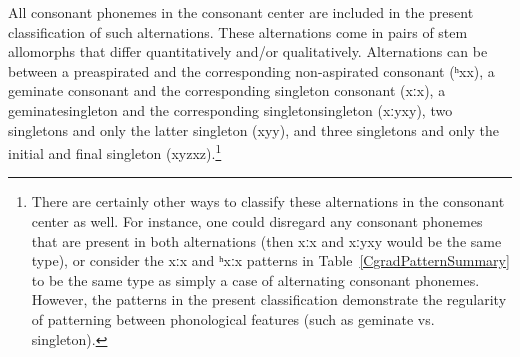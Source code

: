 All consonant phonemes in the consonant center are included in the present classification of such alternations.
These alternations come in pairs of stem allomorphs that differ quantitatively and/or qualitatively. 
Alternations can be between a preaspirated and the corresponding non-aspirated consonant \mbox{(ʰx\Div x)},  
 a geminate consonant and the corresponding singleton consonant \mbox{(xː\Div x)}, 
 a geminate\PLUS singleton and the corresponding singleton\PLUS singleton \mbox{(xːy\Div xy)}, 
 two singletons and only the latter singleton \mbox{(xy\Div y)}, 
and  three singletons and only the initial and final singleton \mbox{(xyz\Div xz)}.\footnote{There are certainly other ways to classify these alternations in the consonant center as well. For instance, one could disregard any consonant phonemes that are present in both alternations (then \mbox{xː\Div x} and \mbox{xːy\Div xy} would be the same type), or consider the xː\Div x and ʰxː\Div x patterns in Table~\ref{CgradPatternSummary} to be the same type as simply a case of alternating consonant phonemes. However, the patterns in the present classification demonstrate the regularity of patterning between phonological features (such as geminate vs. singleton).}  

